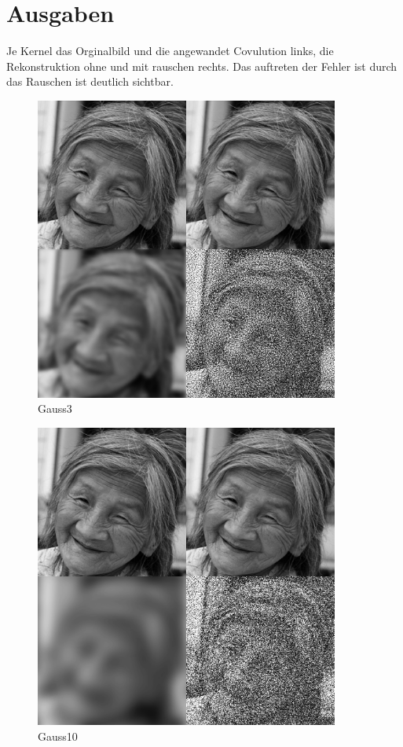 \section*{Ausgaben}
Je Kernel das Orginalbild und die angewandet Covulution links,
die Rekonstruktion ohne und mit rauschen rechts. 
Das auftreten der Fehler ist durch das Rauschen ist deutlich sichtbar.
\begin{figure}[H]
\begin{center}
\includegraphics[width=100mm]{u03/gauss_3.eps}
\end{center}
\caption{Gauss3}
\end{figure}

\begin{figure}[H]
\begin{center}
\includegraphics[width=100mm]{u03/gauss_10.eps}
\end{center}
\caption{Gauss10}
\end{figure}

